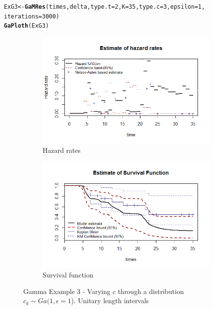 \documentclass[letterpaper]{article}\usepackage[]{graphicx}\usepackage[]{xcolor}
\makeatletter
\newcommand{\hlnum}[1]{\textcolor[rgb]{0.686,0.059,0.569}{#1}}%
\newcommand{\hlstd}[1]{\textcolor[rgb]{0.345,0.345,0.345}{#1}}%
\newcommand{\hlkwb}[1]{\textcolor[rgb]{0.69,0.353,0.396}{#1}}%
\newcommand{\hlkwc}[1]{\textcolor[rgb]{0.333,0.667,0.333}{#1}}%
\newcommand{\hlkwd}[1]{\textcolor[rgb]{0.737,0.353,0.396}{\textbf{#1}}}%
\newenvironment{kframe}{%
 \def\at@end@of@kframe{}%
 \ifinner\ifhmode%
  \def\at@end@of@kframe{\end{minipage}}%
  \begin{minipage}{\columnwidth}%
 \fi\fi%
 \def\FrameCommand##1{\hskip\@totalleftmargin \hskip-\fboxsep
 \colorbox{shadecolor}{##1}\hskip-\fboxsep
     \hskip-\linewidth \hskip-\@totalleftmargin \hskip\columnwidth}%
 \MakeFramed {\advance\hsize-\width
   \@totalleftmargin\z@ \linewidth\hsize
   \@setminipage}}%
 {\par\unskip\endMakeFramed%
 \at@end@of@kframe}
\newenvironment{knitrout}{}{} %
\makeatother
\begin{document}
\begin{knitrout}
\color{fgcolor}\begin{kframe}
\begin{alltt}
\hlstd{ExG3} \hlkwb{<-} \hlkwd{GaMRes}\hlstd{(times, delta,} \hlkwc{type.t} \hlstd{=} \hlnum{2}\hlstd{,} \hlkwc{K} \hlstd{=} \hlnum{35}\hlstd{,} \hlkwc{type.c} \hlstd{=} \hlnum{3}\hlstd{,} \hlkwc{epsilon} \hlstd{=} \hlnum{1}\hlstd{,}
               \hlkwc{iterations} \hlstd{=} \hlnum{3000}\hlstd{)}
\hlkwd{GaPloth}\hlstd{(ExG3)}
\end{alltt}
\end{kframe}
\end{knitrout}

\begin{figure}
  \centering
  \begin{subfigure}[a]{\textwidth}\centering
    \includegraphics[width=\textwidth]{G31.png}
    \caption{Hazard rates}
  \end{subfigure}
  \begin{subfigure}[b]{\textwidth}\centering
    \includegraphics[width=\textwidth]{G32.png}
    \caption{Survival function}
  \end{subfigure}
  \caption{Gamma Example 3 - Varying $c$ through a distribution $c_k\sim Ga(1,\epsilon = 1$). Unitary length intervals}
  \label{fig:G3}
\end{figure}
\end{document}
